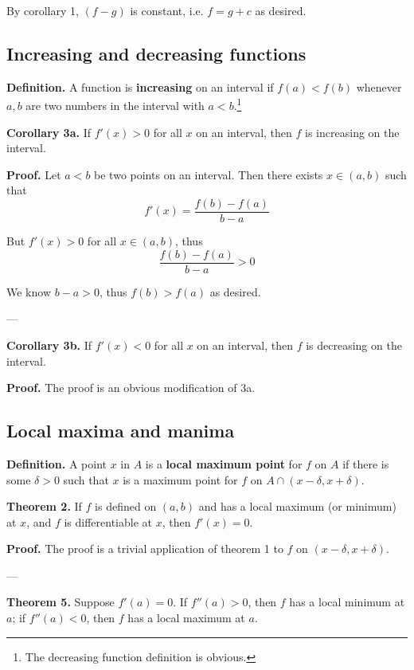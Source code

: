 By corollary 1, $(f-g)$ is constant, i.e. $f=g+c$ as desired.

\subsection{Increasing and decreasing functions}

\textbf{Definition.} A function is \textbf{increasing} on an interval
if $f(a)<f(b)$ whenever $a,b$ are two numbers in the interval with
$a<b$.\footnote{The decreasing function definition is obvious.}

\vs

\textbf{Corollary 3a.} If $f'(x)>0$ for all $x$ on an interval, then
$f$ is increasing on the interval.

\vs

\textbf{Proof.} Let $a<b$ be two points on an interval. Then there
exists $x\in(a,b)$ such that
\[f'(x)=\frac{f(b)-f(a)}{b-a}\]

But $f'(x)>0$ for all $x\in(a,b)$, thus
\[\frac{f(b)-f(a)}{b-a}>0\]

We know $b-a>0$, thus $f(b)>f(a)$ as desired.

\vs---\vs

\textbf{Corollary 3b.} If $f'(x)<0$ for all $x$ on an interval, then
$f$ is decreasing on the interval.

\vs

\textbf{Proof.} The proof is an obvious modification of 3a.

\subsection{Local maxima and manima}
\textbf{Definition.} A point $x$ in $A$ is a \textbf{local maximum
  point} for $f$ on $A$ if there is some $\delta>0$ such that $x$ is a
maximum point for $f$ on $A\cap(x-\delta, x+\delta)$.

\vs

\textbf{Theorem 2.} If $f$ is defined on $(a,b)$ and has a local
maximum (or minimum) at $x$, and $f$ is differentiable at $x$, then
$f'(x)=0$.

\vs

\textbf{Proof.} The proof is a trivial application of theorem 1 to $f$
on $(x-\delta, x+\delta)$.

\vs---\vs

\textbf{Theorem 5.} Suppose $f'(a)=0$. If $f''(a)>0$, then $f$ has a
local minimum at $a$; if $f''(a)<0$, then $f$ has a local maximum at
$a$.

